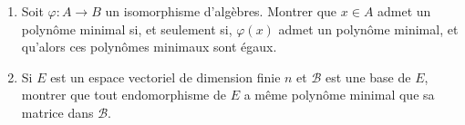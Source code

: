 \documentclass[french]{article}
\theoremstyle{plain}
\theoremstyle{definition}
\theoremstyle{remark}
\begin{document}
\begin{exo}
	\begin{enumerate}
		\item Soit $\varphi:A\to B$ un isomorphisme d'algèbres. Montrer que $x\in A$ admet un polynôme minimal si, et seulement si, $\varphi(x)$ admet un polynôme minimal, et qu'alors ces polynômes minimaux sont égaux.
		\item Si $E$ est un espace vectoriel de dimension finie $n$ et $\mathcal{B}$ est une base de $E$, montrer que tout endomorphisme de $E$ a même polynôme minimal que sa matrice dans $\mathcal{B}$.
	\end{enumerate}
\end{exo}
\end{document}
